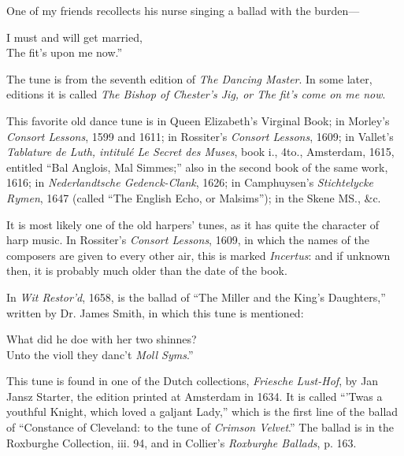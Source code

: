 One of my friends recollects his nurse singing a ballad with the burden—
\settowidth{\versewidth}{I must and will get married,}
\begin{scverse}
I must and will get married,\\
The fit’s upon me now.”
\end{scverse}
\pagebreak

The tune is from the seventh edition of \textit{The Dancing Master}. In some later,
editions it is called \textit{The Bishop of Chester’s Jig, or The fit’s come on me now}.




This favorite old dance tune is in Queen Elizabeth’s Virginal Book; in Morley’s
\textit{Consort Lessons}, 1599 and 1611; in Rossiter’s \textit{Consort Lessons}, 1609; in Vallet’s
\textit{Tablature de Luth, intitulé Le Secret des Muses}, book i., 4to., Amsterdam, 1615,
entitled “Bal Anglois, Mal Simmes;” also in the second book of the same work,
1616; in \textit{Nederlandtsche Gedenck-Clank}, 1626; in Camphuysen’s \textit{Stichtelycke
Rymen}, 1647 (called “The English Echo, or Malsims”); in the Skene MS., \&c.

It is most likely one of the old harpers’ tunes, as it has quite the character of
harp music. In Rossiter’s \textit{Consort Lessons}, 1609, in which the names of the composers
are given to every other air, this is marked \textit{Incertus}: and if unknown
then, it is probably much older than the date of the book.

In \textit{Wit Restor’d}, 1658, is the ballad of “The Miller and the King’s Daughters,”
written by Dr. James Smith, in which this tune is mentioned:
\settowidth{\versewidth}{What did he doe with her two shinnes?}
\begin{scverse}
What did he doe with her two shinnes?\\
Unto the violl they danc’t \textit{Moll Syms}.”
\end{scverse}
\pagebreak




This tune is found in one of the Dutch collections, \textit{Friesche Lust-Hof}, by Jan
Jansz Starter, the edition printed at Amsterdam in 1634. It is called “’Twas a
youthful Knight, which loved a galjant Lady,” which is the first line of the
ballad of “Constance of Cleveland: to the tune of \textit{Crimson Velvet}.” The
ballad is in the Roxburghe Collection, iii. 94, and in Collier’s \textit{Roxburghe
Ballads}, p. 163.

